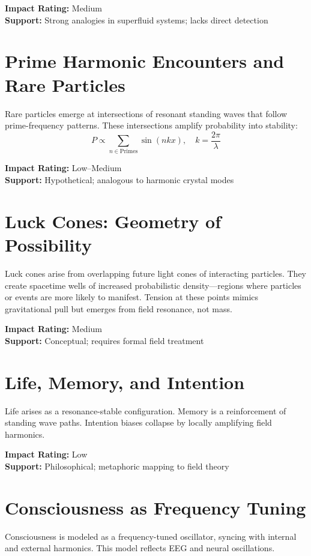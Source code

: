 \documentclass[12pt]{article}
\begin{document}
\textbf{Impact Rating:} Medium\\
\textbf{Support:} Strong analogies in superfluid systems; lacks direct detection

\section{Prime Harmonic Encounters and Rare Particles}
Rare particles emerge at intersections of resonant standing waves that follow prime-frequency patterns. These intersections amplify probability into stability:
\begin{equation}
 P \propto \sum_{n \in \text{Primes}} \sin(nk x), \quad k = \frac{2\pi}{\lambda}
\end{equation}

\textbf{Impact Rating:} Low--Medium\\
\textbf{Support:} Hypothetical; analogous to harmonic crystal modes

\section{Luck Cones: Geometry of Possibility}
Luck cones arise from overlapping future light cones of interacting particles. They create spacetime wells of increased probabilistic density---regions where particles or events are more likely to manifest. Tension at these points mimics gravitational pull but emerges from field resonance, not mass.

\textbf{Impact Rating:} Medium\\
\textbf{Support:} Conceptual; requires formal field treatment

\section{Life, Memory, and Intention}
Life arises as a resonance-stable configuration. Memory is a reinforcement of standing wave paths. Intention biases collapse by locally amplifying field harmonics.

\textbf{Impact Rating:} Low\\
\textbf{Support:} Philosophical; metaphoric mapping to field theory

\section{Consciousness as Frequency Tuning}
Consciousness is modeled as a frequency-tuned oscillator, syncing with internal and external harmonics. This model reflects EEG and neural oscillations.
\end{document}
